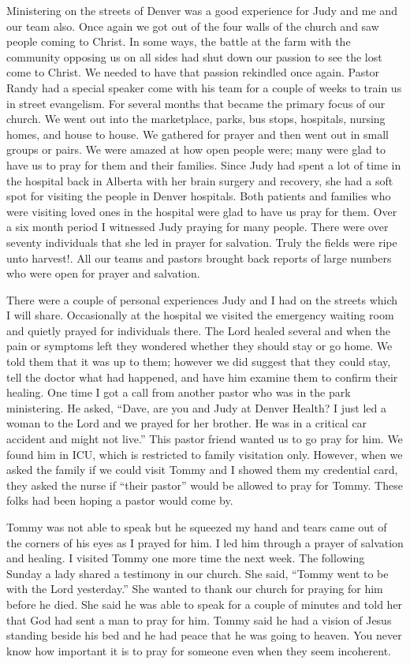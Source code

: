 \documentclass[oneside]{book}
\begin{document}
Ministering on the streets of Denver was a good experience for Judy and me and our team also. Once again we got out of the four walls of the church and saw people coming to Christ. In some ways, the battle at the farm with the community opposing us on all sides had shut down our passion to see the lost come to Christ. We needed to have that passion rekindled once again. Pastor Randy had a special speaker come with his team for a couple of weeks to train us in street evangelism. For several months that became the primary focus of our church. We went out into the marketplace, parks, bus stops, hospitals, nursing homes, and house to house. We gathered for prayer and then went out in small groups or pairs. We were amazed at how open people were; many were glad to have us to pray for them and their families. Since Judy had spent a lot of time in the hospital back in Alberta with her brain surgery and recovery, she had a soft spot for visiting the people in Denver hospitals. Both patients and families who were visiting loved ones in the hospital were glad to have us pray for them. Over a six month period I witnessed Judy praying for many people. There were over seventy individuals that she led in prayer for salvation. Truly the fields were ripe unto harvest!. All our teams and pastors brought back reports of large numbers who were open for prayer and salvation. 


There were a couple of personal experiences Judy and I had on the streets which I will share. Occasionally at the hospital we visited the emergency waiting room and quietly prayed for individuals there. The Lord healed several and when the pain or symptoms left they wondered whether they should stay or go home. We told them that it was up to them; however we did  suggest that they could stay, tell the doctor what had happened, and have him examine them to confirm their healing. One time I got a call from another pastor who was in the park ministering. He asked, “Dave, are you and Judy at Denver Health? I just led a woman to the Lord and we prayed for her brother. He was in a critical car accident and might not live.” This pastor friend wanted us to go pray for him. We found him in ICU, which is restricted to family visitation only. However, when we asked the family if we could visit Tommy and I showed them my credential card, they asked the nurse if “their pastor” would be allowed to pray for Tommy. These folks had been hoping a pastor would come by. 

Tommy was not able to speak but he squeezed my hand and tears came out of the corners of his eyes as I prayed for him. I led him through a prayer of salvation and healing. I visited Tommy one more time the next week. The following Sunday a lady shared a testimony in our church. She said, “Tommy went to be with the Lord yesterday.” She wanted to thank our church for praying for him before he died. She said he was able to speak for a couple of minutes and told her that God had sent a man to pray for him. Tommy said he had a vision of Jesus standing beside his bed and he had peace that he was going to heaven. You never know how important it is to pray for someone even when they seem incoherent. 
\end{document}
